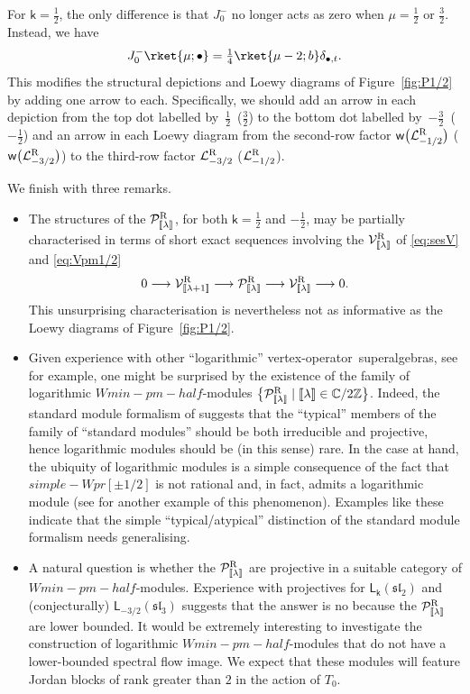 \documentclass[10pt,a4paper]{amsart}
\numberwithin{equation}{section}
\newcommand{\kk}{\mathsf{k}} %
\newcommand{\R}{\textnormal{R}}
\DeclarePairedDelimiter{\brac}{\lparen}{\rparen} %
\DeclarePairedDelimiter{\dbrac}{\llbracket}{\rrbracket} %
\newcommand{\lra}{\longrightarrow}
\newcommand{\ses}[3]{0 \lra #1 \lra #2 \lra #3 \lra 0}
\newcommand{\fld}[1]{\mathbb{#1}} %
\newcommand{\alg}[1]{\mathfrak{#1}} %
\newcommand{\VOA}[1]{\mathsf{#1}} %
\newcommand{\Mod}[1]{\mathcal{#1}} %
\newcommand{\ZZ}{\fld{Z}}
\newcommand{\CC}{\fld{C}}
\newcommand{\SLA}[2]{\alg{#1}_{#2}} %
\newcommand{\sltwo}{\SLA{sl}{2}}
\newcommand{\slthree}{\SLA{sl}{3}}
\newcommand{\saff}[2]{\VOA{L}_{#1}(#2)} %
\newcommand{\ssl}[1][\kk]{\saff{#1}{\sltwo}} %
\newcommand{\swalg}[2]{\VOA{W}_{#1}^{\mathrm{#2}}} %
\newcommand{\spr}[1][\kk]{\swalg{#1}{pr}} %
\newcommand{\smin}[1][\kk]{\swalg{#1}{min}} %
\newcommand{\sminpmhalf}{\smin[\pm 1/2]}
\newcommand{\nconjsymb}{\mathsf{w}} %
\newcommand{\nconj}{\nconjsymb \brac}
\newcommand{\nrihw}[1]{\Mod{L}^{\R}_{#1}}
\newcommand{\nrver}[1]{\Mod{V}^{\R}_{\vphantom{[#1]}\smash{\dbrac{#1}}}}
\newcommand{\nrsublog}[1]{\Mod{P}^{\R}_{\vphantom{[#1]}\smash{\dbrac{#1}}}}
\newcommand{\vo}{vertex-operator}
\newcommand{\svoa}{\vo\ superalgebra}
\newcommand{\svoas}{\svoa s}
\def\smash#1{#1}
\def\spr{simple-Wpr}
\def\sminpmhalf{Wmin-pm-half}
\begin{document}
For $\kk=\frac{1}{2}$, the only difference is that $J^-_0$ no longer acts as zero when $\mu=\frac{1}{2}$ or $\frac{3}{2}$.
Instead, we have
\[
	J^-_0 \rket{\mu;\bullet} = \tfrac{1}{4} \rket{\mu-2;b} \delta_{\bullet,t}.
\]
This modifies the structural depictions and Loewy diagrams of Figure~\ref{fig:P1/2} by adding one arrow to each.
Specifically, we should add an arrow in each depiction from the top dot labelled by~$\frac{1}{2}$~\big($\frac{3}{2}$\big) to the bottom dot labelled by~$-\frac{3}{2}$~\big($-\frac{1}{2}$\big) and an arrow in each Loewy diagram from the second-row factor $\nconj[\big]{\nrihw{-1/2}}$ \big($\nconj[\big]{\nrihw{-3/2}}$\big) to the third-row factor $\nrihw{-3/2}$ \big($\nrihw{-1/2}$\big).

We finish with three remarks.
\begin{itemize}\itemsep=0pt
	\item The structures of the \smash{$\nrsublog{\lambda}$}, for both $\kk=\frac{1}{2}$ and $-\frac{1}{2}$, may be partially characterised in terms of short exact sequences involving the \smash{$\nrver{\lambda}$} of \eqref{eq:sesV} and \eqref{eq:Vpm1/2}
	\[
		\ses{\nrver{\lambda+1}}{\nrsublog{\lambda}}{\nrver{\lambda}}.
	\]
	This unsurprising characterisation is nevertheless not as informative as the Loewy diagrams of Figure~\ref{fig:P1/2}.
	\item Given experience with other ``logarithmic'' \svoas, see \cite{CreLog13} for example, one might be surprised by the existence of the family of logarithmic \smash{$\sminpmhalf$}-modules \smash{$\bigl\{\nrsublog{\lambda} \mid \dbrac{\lambda} \in \CC/2\ZZ\bigr\}$}.
	Indeed, the standard module formalism of \cite{CreLog13,RidVer14} suggests that the ``typical'' members of the family of ``standard modules'' should be both irreducible and projective, hence logarithmic modules should be (in this sense) rare.
	In the case at hand, the ubiquity of logarithmic modules is a simple consequence of the fact that \smash{$\spr[\pm1/2]$} is not rational and, in fact, admits a logarithmic module (see \cite[Section~4.2]{AdaWei23} for another example of this phenomenon).
	Examples like these indicate that the simple ``typical/atypical'' distinction of the standard module formalism needs generalising.
	\item A natural question is whether the \smash{$\nrsublog{\lambda}$} are projective in a suitable category of \smash{$\sminpmhalf$}-modules.
	Experience with projectives for $\ssl$ \cite{AraWei23,CreCos18} and (conjecturally) $\saff{-3/2}{\slthree}$ \cite{CreKaz21} suggests that the answer is no because the \smash{$\nrsublog{\lambda}$} are lower bounded.
	It would be extremely interesting to investigate the construction of logarithmic \smash{$\sminpmhalf$}-modules that do not have a lower-bounded spectral flow image.
	We expect that these modules will feature Jordan blocks of rank greater than $2$ in the action of $T_0$.
\end{itemize}
\end{document}
